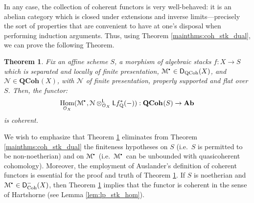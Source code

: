 \documentclass{amsart}
\theoremstyle{plain}
\newtheorem{mainthm}{Theorem}
\theoremstyle{definition}
\theoremstyle{remark}
\numberwithin{equation}{section}
\newcommand{\Orb}{\mathcal{O}}
\newcommand{\QCOHB}{\mathbf{QCoh}}
\newcommand{\QCOH}[2][]{\QCOHB^{#1}({#2})}
\DeclareMathOperator{\Hom}{Hom}
\newcommand{\LDERF}{\mathsf{L}}
\newcommand{\DCAT}{\mathsf{D}}
\newcommand{\tensor}{\otimes}
\newcommand{\AB}{\mathbf{Ab}}
\newcommand{\shv}[1]{\mathcal{{#1}}}
\newcommand{\QCPBK}[1]{{#1}_{\mathrm{Q}}^*}
\newcommand{\DQCOH}{\DCAT_{\mathrm{QCoh}}}
\newcommand{\DCOH}{\DCAT_{\mathrm{Coh}}}
\newcommand{\sbt}{\,\begin{picture}(-1,-1)(0,-2)\circle*{1.5}\end{picture}\ }
\newcommand{\cplx}[1]{\shv{{#1}}^{\sbt}}
\begin{document}
In any case, the
collection of coherent functors is very well-behaved: it is an 
abelian category which is closed under extensions and inverse
limits---precisely the sort of properties that are convenient
to have at one's disposal when performing induction arguments. Thus, using
Theorem \ref{mainthms:coh_stk_dual}, we can prove the following Theorem. 
\begin{mainthm}\label{mainthms:cohstk_flat}
  Fix an affine scheme $S$, a morphism of algebraic stacks $f : X \to
  S$ which is separated and locally of finite presentation, 
  $\cplx{M}\in \DQCOH(X)$, and $\shv{N} \in \QCOH{X}$, with $\shv{N}$ of finite
  presentation, properly supported and flat over $S$. Then, the functor:
  \[
  \Hom_{\Orb_X}(\cplx{M}, \shv{N}\tensor_{\Orb_X}^\LDERF \LDERF \QCPBK{f}(-)) : \QCOH{S}
  \to \AB
  \]
  is coherent. 
\end{mainthm}
We wish to emphasize that Theorem \ref{mainthms:cohstk_flat}
eliminates from Theorem \ref{mainthms:coh_stk_dual} the finiteness
hypotheses on $S$ (i.e.~$S$ is permitted to be non-noetherian) and on
$\cplx{M}$ (i.e.~$\cplx{M}$ can be unbounded with quasicoherent
cohomology). Moreover, the employment of Auslander's definition of
coherent functors is essential for the proof and truth of Theorem
\ref{mainthms:cohstk_flat}. If $S$ is noetherian and $\cplx{M} \in
\DCOH^-(X)$, then Theorem \ref{mainthms:cohstk_flat}
implies that the functor is coherent in the sense of Hartshorne (see Lemma \ref{lem:lp_stk_hom}). 
 
\end{document}
